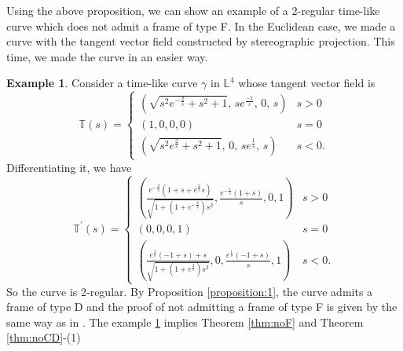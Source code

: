 \documentclass[a4paper]{amsart}
\theoremstyle{definition}
\newtheorem{example}[theorem]{Example}
\theoremstyle{remark}
\newcommand{\TT}{\mathbb{T}}
\newcommand{\LL}{\mathbb{L}}
\numberwithin{equation}{section}
\begin{document}
   

Using the above proposition, we can show an example of a 2-regular time-like curve which does not admit a frame of type F. In the Euclidean case, we made a curve with the tangent vector field constructed by stereographic projection. This time, we made the curve in an easier way.
\begin{example}\label{ex:noF}
Consider a time-like curve $\gamma$ in $\LL^{4}$ whose tangent vector field is
\begin{equation}
\TT(s)=\begin{cases}
\displaystyle \left(\sqrt{s^{2}e^{-\frac{2}{s}}+s^{2}+1}, \, s e^{\frac{-1}{s}}, \, 0, \, s\right) & s> 0\\
(1, 0, 0, 0) & s=0\\
\displaystyle \left(\sqrt{s^{2}e^{\frac{2}{s}}+s^{2}+1},\, 0, \, s e^{\frac{1}{s}}, \, s\right) & s< 0.\end{cases}
\end{equation}
Differentiating it, we have
\begin{equation}
\TT^{\prime}(s)=\begin{cases}
\displaystyle \left(\frac{e^{-\frac{2}{s}}(1+s+e^{\frac{2}{s}}s)}{\sqrt{1+(1+e^{-\frac{2}{s}})s^{2}}}, \frac{e^{-\frac{1}{s}}(1+s)}{s}, 0, 1\right) & s> 0\\
(0, 0, 0, 1) & s=0\\
\displaystyle \left(\frac{e^{\frac{2}{s}}(-1+s)+s}{\sqrt{1+(1+e^{\frac{2}{s}})s^{2}}}, 0, \frac{e^{\frac{1}{s}}(-1+s)}{s}, 1\right) & s< 0.\end{cases}
\end{equation}
So the curve is 2-regular. By Proposition \ref{proposition:1}, the curve admits a frame of type D and the proof of not admitting a frame of type F is given by the same way as in \cite{NN}. The example \ref{ex:noF} implies Theorem \ref{thm:noF} and Theorem \ref{thm:noCD}-(1)
\end{example}
\end{document}
